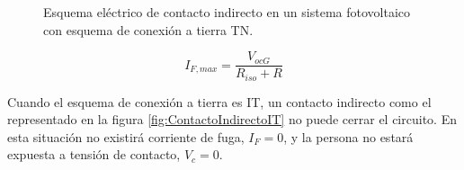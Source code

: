 %
\begin{figure}
\hfill{}\hfill{}\hfill{}

\caption{Esquema eléctrico de contacto indirecto en un sistema fotovoltaico
con esquema de conexión a tierra TN.\label{fig:ContactoIndirectoTN}}

\end{figure}


\begin{equation}
I_{F,max}=\frac{V_{ocG}}{R_{iso}+R}\label{eq:IfugaTN}\end{equation}


Cuando el esquema de conexión a tierra es IT, un contacto indirecto
como el representado en la figura \ref{fig:ContactoIndirectoIT} no
puede cerrar el circuito. En esta situación no existirá corriente
de fuga, $I_{F}=0$, y la persona no estará expuesta a tensión de
contacto, $V_{c}=0$.

